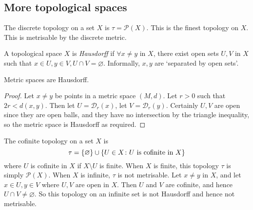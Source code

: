 \subsection{More topological spaces}
\begin{example}
	The discrete topology on a set \( X \) is \( \tau = \mathcal P(X) \).
	This is the finest topology on \( X \).
	This is metrisable by the discrete metric.
\end{example}
\begin{definition}
	A topological space \( X \) is \textit{Hausdorff} if \( \forall x \neq y \) in \( X \), there exist open sets \( U, V \) in \( X \) such that \( x \in U, y \in V, U \cap V = \varnothing \).
	Informally, \( x, y \) are `separated by open sets'.
\end{definition}
\begin{proposition}
	Metric spaces are Hausdorff.
\end{proposition}
\begin{proof}
	Let \( x \neq y \) be points in a metric space \( (M, d) \).
	Let \( r > 0 \) such that \( 2r < d(x,y) \).
	Then let \( U = \mathcal D_r(x) \), let \( V = \mathcal D_r(y) \).
	Certainly \( U, V \) are open since they are open balls, and they have no intersection by the triangle inequality, so the metric space is Hausdorff as required.
\end{proof}
\begin{example}
	The cofinite topology on a set \( X \) is
	\[ \tau = \qty{\varnothing} \cup \qty{U \in X \colon U \text{ is cofinite in } X} \]
	where \( U \) is cofinite in \( X \) if \( X \setminus U \) is finite.
	When \( X \) is finite, this topology \( \tau \) is simply \( \mathcal P(X) \).
	When \( X \) is infinite, \( \tau \) is not metrisable.
	Let \( x \neq y \) in \( X \), and let \( x \in U, y \in V \) where \( U, V \) are open in \( X \).
	Then \( U \) and \( V \) are cofinite, and hence \( U \cap V \neq \varnothing \).
	So this topology on an infinite set is not Hausdorff and hence not metrisable.
\end{example}

